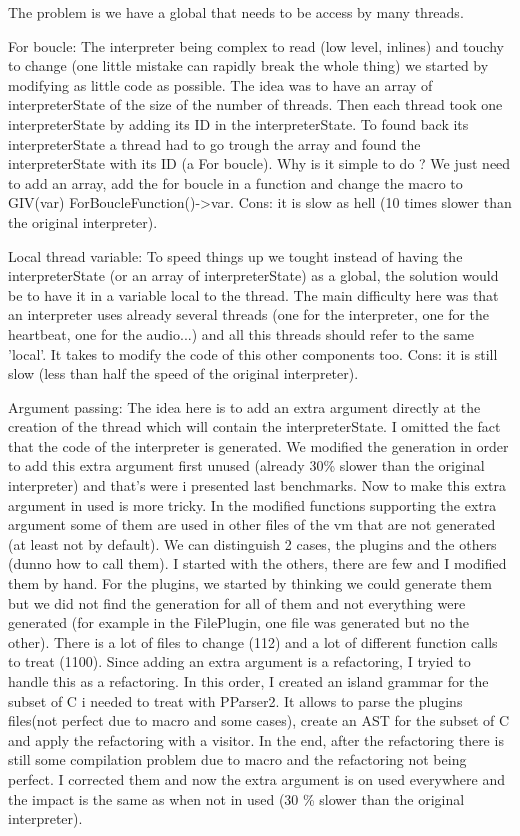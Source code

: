 \documentclass[11pt]{article} %
\begin{document}
The problem is we have a global that needs to be access by many threads.

For boucle: The interpreter being complex to read (low level, inlines) and touchy to change (one little mistake can rapidly break the whole thing) we started by modifying as little code as possible.
The idea was to have an array of interpreterState of the size of the number of threads. Then each thread took one interpreterState by adding its ID in the interpreterState. To found back its interpreterState a thread had to go trough the array and found the interpreterState with its ID (a For boucle).
Why is it simple to do ? We just need to add an array, add the for boucle in a function and change the macro to GIV(var) ForBoucleFunction()->var.
Cons: it is slow as hell (10 times slower than the original interpreter).

Local thread variable: To speed things up we tought instead of having the interpreterState (or an array of interpreterState) as a global, the solution would be to have it in a variable local to the thread.
The main difficulty here was  that an interpreter uses already several threads (one for the interpreter, one for the heartbeat, one for the audio...) and all this threads should refer to the same 'local'.
It takes to modify the code of this other components too.
Cons: it is still slow (less than half the speed of the original interpreter).

Argument passing: The idea here is to add an extra argument directly at the creation of the thread which will contain the interpreterState. I omitted the fact that the code of the interpreter is generated. We modified the generation in order to add this extra argument first unused (already 30\% slower than the original interpreter) and that's were i presented last benchmarks.
Now to make this extra argument in used is more tricky. In the modified functions supporting the extra argument some of them are used in other files of the vm that are not generated (at least not by default). We can distinguish 2 cases, the plugins and the others (dunno how to call them). I started with the others, there are few and I modified them by hand. For the plugins, we started by thinking we could generate them but we did not find the generation for all of them and not everything were generated (for example in the FilePlugin, one file was generated but no the other). There is a lot of files to change (112) and a lot of different function calls to treat (1100). Since adding an extra argument is a refactoring, I tryied to handle this as a refactoring. In this order, I created an island grammar for the subset of C i needed to treat with PParser2. It allows to parse the plugins files(not perfect due to macro and some cases), create an AST for the subset of C and apply the refactoring with a visitor. In the end, after the refactoring there is still some compilation problem due to macro and the refactoring not being perfect. I corrected them and now the extra argument is on used everywhere and the impact is the same as when not in used (30 \% slower than the original interpreter).
\end{document}
